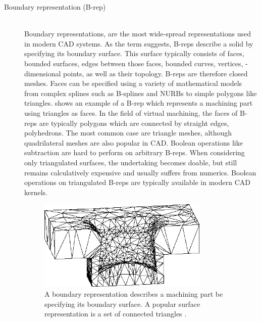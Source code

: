 \begin{description}
	\item[Boundary representation (B-rep)] \hfill \\
	Boundary representations, are the most wide-spread representations used in modern CAD systems.
	As the term suggests, B-reps describe a solid by specifying its boundary surface.
	This surface typically consists of faces, \ie bounded surfaces, edges between those faces, \ie bounded curves, vertices, -dimensional points, as well as their topology.
	B-reps are therefore closed meshes.
	Faces can be specified using a variety of mathematical models from complex splines such as B-splines and NURBs to simple polygons like triangles.
	 shows an example of a B-rep which represents a machining part using triangles as faces.
	In the field of virtual machining, the faces of B-reps are typically polygons which are connected by straight edges, \ie polyhedrons.
	The most common case are triangle meshes, although quadrilateral meshes are also popular in CAD.
	Boolean operations like subtraction are hard to perform on arbitrary B-reps.
	When considering only triangulated surfaces, the undertaking becomes doable, but still remains calculatively expensive and usually suffers from numerics.
	Boolean operations on triangulated B-reps are typically available in modern CAD kernels.

	\begin{figure}[H]
		\centering
		\includegraphics[width=0.8\textwidth]{images/brep}
		\caption{
			A boundary representation describes a machining part be specifying its boundary surface. A popular surface representation is a set of connected triangles \cite{virtual_machining_review}.
		}
		\label{fig:brep}
	\end{figure}


\end{description}
